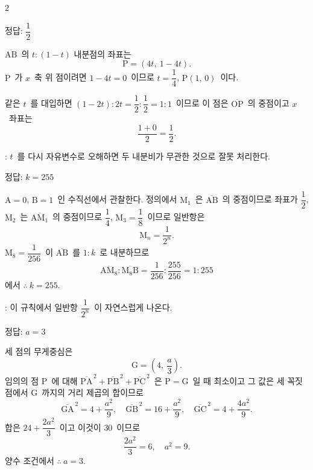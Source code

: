 \documentclass[10pt,fleqn]{article}   %
\begin{document}
\dmsoltitlefirsttrue
\begin{multicols*}{2}

\begin{dmanswerbox}
정답: $\dfrac{1}{2}$
\end{dmanswerbox}

$\overline{\mathrm{AB}}$\ 의 $t:(1-t)$ 내분점의 좌표는
\[ \mathrm{P} = (4t,\ 1 - 4t). \]
$\mathrm{P}$\ 가 $x$\ 축 위 점이려면 $1-4t=0$\ 이므로 $t=\dfrac{1}{4}$, $\mathrm{P}(1,\,0)$\ 이다.

같은 $t$\ 를 대입하면 $(1-2t):2t=\dfrac{1}{2}:\dfrac{1}{2}=1:1$\ 이므로 이 점은 $\overline{\mathrm{OP}}$\ 의 중점이고 $x$\ 좌표는
\[ \dfrac{1+0}{2} = \dfrac{1}{2}. \]

\begin{dmcriticalpoint}
: $t$\ 를 다시 자유변수로 오해하면 두 내분비가 무관한 것으로 잘못 처리한다.
\end{dmcriticalpoint}

\begin{dmanswerbox}
정답: $k=255$
\end{dmanswerbox}

$\mathrm{A}=0$, $\mathrm{B}=1$\ 인 수직선에서 관찰한다. 정의에서 $\mathrm{M}_1$\ 은 $\overline{\mathrm{AB}}$\ 의 중점이므로 좌표가 $\dfrac{1}{2}$, $\mathrm{M}_2$\ 는 $\overline{\mathrm{AM}_1}$\ 의 중점이므로 $\dfrac{1}{4}$, $\mathrm{M}_3=\dfrac{1}{8}$\ 이므로 일반항은
\[ \mathrm{M}_n = \dfrac{1}{2^n}. \]
$\mathrm{M}_{8} = \dfrac{1}{256}$\ 이 $\overline{\mathrm{AB}}$\ 를 $1:k$\ 로 내분하므로
$$\overline{\mathrm{AM}_{8}} : \overline{\mathrm{M}_{8}\mathrm{B}} = \dfrac{1}{256} : \dfrac{255}{256} = 1 : 255$$
에서 $\therefore\ k = 255$.

\begin{dmcriticalpoint}
: 이 규칙에서 일반항 $\dfrac{1}{2^n}$\ 이 자연스럽게 나온다.
\end{dmcriticalpoint}

\begin{dmanswerbox}
정답: $a=3$
\end{dmanswerbox}

세 점의 무게중심은
\[ \mathrm{G} = \left( 4,\ \dfrac{a}{3} \right). \]
임의의 점 $\mathrm{P}$\ 에 대해 $\overline{\mathrm{PA}}^{\,2}+\overline{\mathrm{PB}}^{\,2}+\overline{\mathrm{PC}}^{\,2}$\ 은 $\mathrm{P}=\mathrm{G}$\ 일 때 최소이고 그 값은 세 꼭짓점에서 $\mathrm{G}$\ 까지의 거리 제곱의 합이므로
$$\overline{\mathrm{GA}}^{\,2} = 4 + \dfrac{a^2}{9},\quad \overline{\mathrm{GB}}^{\,2} = 16 + \dfrac{a^2}{9},\quad \overline{\mathrm{GC}}^{\,2} = 4 + \dfrac{4a^2}{9}.$$
합은 $24 + \dfrac{2a^2}{3}$\ 이고 이것이 $30$\ 이므로
\[ \dfrac{2a^2}{3} = 6,\quad a^2 = 9. \]
양수 조건에서 $\therefore\ a = 3$.


\end{multicols*}
\end{document}
